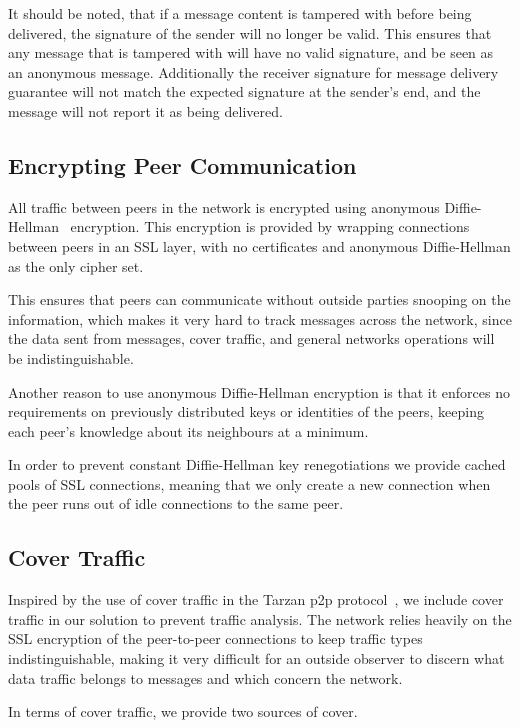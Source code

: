 It should be noted, that if a message content is tampered with before being delivered, the signature of the sender will no longer be valid. This ensures that any message that is tampered with will have no valid signature, and be seen as an anonymous message.
Additionally the receiver signature for message delivery guarantee will not match the expected signature at the sender's end, and the message will not report it as being delivered.
 
\subsection{Encrypting Peer Communication}

All traffic between peers in the network is encrypted using anonymous Diffie-Hellman~\citep{DH} encryption. This encryption is provided by wrapping connections between peers in an SSL layer, with no certificates and anonymous Diffie-Hellman as the only cipher set.

This ensures that peers can communicate without outside parties snooping on the information, which makes it very hard to track messages across the network, since the data sent from messages, cover traffic, and general networks operations will be indistinguishable.

Another reason to use anonymous Diffie-Hellman encryption is that it enforces no requirements on previously distributed keys or identities of the peers, keeping each peer's knowledge about its neighbours at a minimum.

In order to prevent constant Diffie-Hellman key renegotiations we provide cached pools of SSL connections, meaning that we only create a new connection when the peer runs out of idle connections to the same peer.

\subsection{Cover Traffic}

Inspired by the use of cover traffic in the Tarzan p2p protocol~\citep{tarzan}, we include cover traffic in our solution to prevent traffic analysis. The network relies heavily on the SSL encryption of the peer-to-peer connections to keep traffic types indistinguishable, making it very difficult for an outside observer to discern what data traffic belongs to messages and which concern the network.

In terms of cover traffic, we provide two sources of cover.

